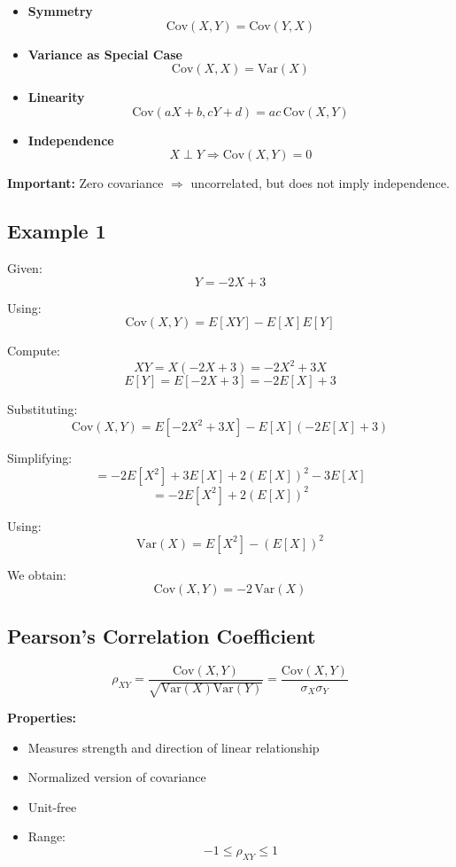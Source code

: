 \documentclass[12pt]{article}
\begin{document}
\begin{itemize}
    \item \textbf{Symmetry}
    \[
    \text{Cov}(X,Y) = \text{Cov}(Y,X)
    \]
    
    \item \textbf{Variance as Special Case}
    \[
    \text{Cov}(X,X) = \text{Var}(X)
    \]
    
    \item \textbf{Linearity}
    \[
    \text{Cov}(aX + b, cY + d) = ac \, \text{Cov}(X,Y)
    \]
    
    \item \textbf{Independence}
    \[
    X \perp Y \Rightarrow \text{Cov}(X,Y) = 0
    \]
\end{itemize}

\textbf{Important:} Zero covariance $\Rightarrow$ uncorrelated, but does not imply independence.

\subsection{Example 1}

Given:
\[
Y = -2X + 3
\]

Using:
\[
\text{Cov}(X,Y) = E[XY] - E[X]E[Y]
\]

Compute:
\[
XY = X(-2X + 3) = -2X^2 + 3X
\]
\[
E[Y] = E[-2X + 3] = -2E[X] + 3
\]

Substituting:
\[
\text{Cov}(X,Y) = E[-2X^2 + 3X] - E[X](-2E[X] + 3)
\]

Simplifying:
\[
= -2E[X^2] + 3E[X] + 2(E[X])^2 - 3E[X]
\]
\[
= -2E[X^2] + 2(E[X])^2
\]

Using:
\[
\text{Var}(X) = E[X^2] - (E[X])^2
\]

We obtain:
\[
\text{Cov}(X,Y) = -2 \, \text{Var}(X)
\]

\subsection{Pearson’s Correlation Coefficient}

\[
\rho_{XY} = \frac{\text{Cov}(X,Y)}{\sqrt{\text{Var}(X)\text{Var}(Y)}} = \frac{\text{Cov}(X,Y)}{\sigma_X \sigma_Y}
\]

\textbf{Properties:}
\begin{itemize}
    \item Measures strength and direction of linear relationship
    \item Normalized version of covariance
    \item Unit-free
    \item Range:
    \[
    -1 \le \rho_{XY} \le 1
    \]
\end{itemize}
\end{document}
